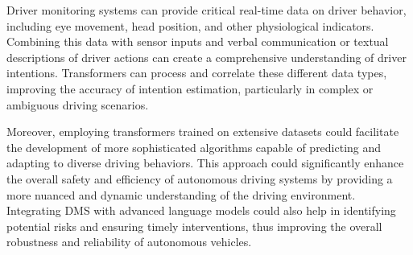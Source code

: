Driver monitoring systems can provide critical real-time data on driver behavior, including eye movement, head position, and other physiological indicators. Combining this data with sensor inputs and verbal communication or textual descriptions of driver actions can create a comprehensive understanding of driver intentions. Transformers can process and correlate these different data types, improving the accuracy of intention estimation, particularly in complex or ambiguous driving scenarios.

Moreover, employing transformers trained on extensive datasets could facilitate the development of more sophisticated algorithms capable of predicting and adapting to diverse driving behaviors. This approach could significantly enhance the overall safety and efficiency of autonomous driving systems by providing a more nuanced and dynamic understanding of the driving environment. Integrating DMS with advanced language models could also help in identifying potential risks and ensuring timely interventions, thus improving the overall robustness and reliability of autonomous vehicles.